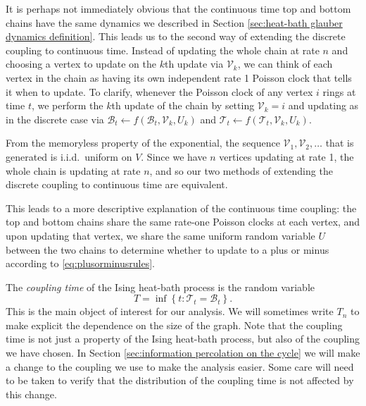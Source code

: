 	It is perhaps not immediately obvious that the continuous time top and bottom chains have the same dynamics we described in Section \ref{sec:heat-bath glauber dynamics definition}. This leads us to the second way of extending the discrete coupling to continuous time. Instead of updating the whole chain at rate $n$ and choosing a vertex to update on the $k$th update via $\mathcal{V}_k$, we can think of each vertex in the chain as having its own independent rate 1 Poisson clock that tells it when to update. To clarify, whenever the Poisson clock of any vertex $i$ rings at time $t$, we perform the $k$th update of the chain by setting $\mathcal{V}_k = i$ and updating as in the discrete case via $\mathscr{B}_t \leftarrow f(\mathscr{B}_t, \mathcal{V}_k, U_k)$ and $\mathscr{T}_t \leftarrow f(\mathscr{T}_t, \mathcal{V}_k, U_k)$.

	From the memoryless property of the exponential, the sequence $\mathcal{V}_1, \mathcal{V}_2, \dots$ that is generated is i.i.d.\ uniform on $V$. Since we have $n$ vertices updating at rate 1, the whole chain is updating at rate $n$, and so our two methods of extending the discrete coupling to continuous time are equivalent.


	This leads to a more descriptive explanation of the continuous time coupling: the top and bottom chains share the same rate-one Poisson clocks at each vertex, and upon updating that vertex, we share the same uniform random variable $U$ between the two chains to determine whether to update to a plus or minus according to \eqref{eq:plusorminusrules}.

	The \emph{coupling time} of the Ising heat-bath process is the random variable
	\begin{equation}
		T = \inf \left\{t : \mathscr{T}_t = \mathscr{B}_t \right\}.	
	\end{equation}
	This is the main object of interest for our analysis. We will sometimes write $T_n$ to make explicit the dependence on the size of the graph. Note that the coupling time is not just a property of the Ising heat-bath process, but also of the coupling we have chosen. In Section \ref{sec:information percolation on the cycle} we will make a change to the coupling we use to make the analysis easier. Some care will need to be taken to verify that the distribution of the coupling time is not affected by this change.

